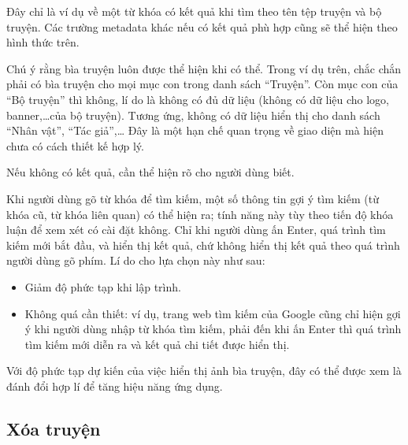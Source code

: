\documentclass[../../thesis]{subfiles}
\begin{document}
Đây chỉ là ví dụ về một từ khóa có kết quả khi tìm theo tên tệp truyện và bộ
truyện. Các trường metadata khác nếu có kết quả phù hợp cũng sẽ thể hiện theo
hình thức trên.

Chú ý rằng bìa truyện luôn được thể hiện khi có thể. Trong ví dụ trên, chắc chắn
phải có bìa truyện cho mọi mục con trong danh sách ``Truyện''. Còn mục con của
``Bộ truyện'' thì không, lí do là không có đủ dữ liệu (không có dữ liệu cho
logo, banner,\ldots của bộ truyện). Tương ứng, không có dữ liệu hiển thị cho
danh sách ``Nhân vật'', ``Tác giả'',\ldots{} Đây là một hạn chế quan trọng về
giao diện mà hiện chưa có cách thiết kế hợp lý.

Nếu không có kết quả, cần thể hiện rõ cho người dùng biết.

Khi người dùng gõ từ khóa để tìm kiếm, một số thông tin gợi ý tìm kiếm (từ khóa
cũ, từ khóa liên quan) có thể hiện ra; tính năng này tùy theo tiến độ khóa luận
để xem xét có cài đặt không. Chỉ khi người dùng ấn Enter, quá trình tìm kiếm mới
bắt đầu, và hiển thị kết quả, chứ không hiển thị kết quả theo quá trình người
dùng gõ phím. Lí do cho lựa chọn này như sau:

\begin{itemize}
    \item
        Giảm độ phức tạp khi lập trình.
    \item
        Không quá cần thiết: ví dụ, trang web tìm kiếm của Google cũng chỉ hiện
        gợi ý khi người dùng nhập từ khóa tìm kiếm, phải đến khi ấn Enter thì
        quá trình tìm kiếm mới diễn ra và kết quả chi tiết được hiển thị.
\end{itemize}

Với độ phức tạp dự kiến của việc hiển thị ảnh bìa truyện, đây có thể được xem là
đánh đổi hợp lí để tăng hiệu năng ứng dụng.

\subsection{Xóa truyện}\label{sec:delete-comic}
\end{document}
